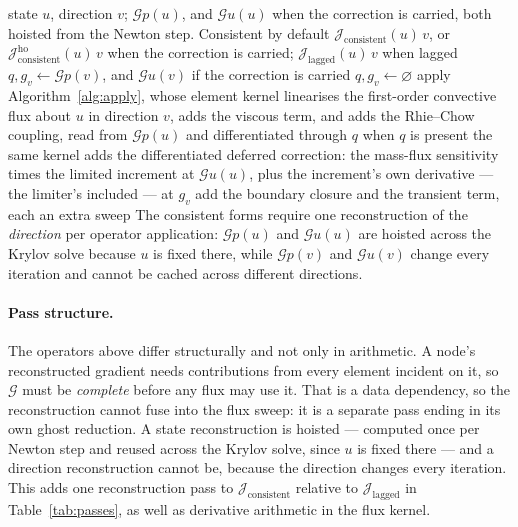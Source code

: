 \documentclass[sigconf,nonacm]{acmart}
\newcommand{\Gop}{\mathcal{G}}
\newcommand{\Jlag}{\mathcal{J}_{\mathrm{lagged}}}
\newcommand{\Jex}{\mathcal{J}_{\mathrm{consistent}}}
\newcommand{\Jhoex}{\mathcal{J}^{\mathrm{ho}}_{\mathrm{consistent}}}
\begin{document}
\begin{algorithm}
\caption{Jacobian action: $\Jex$, $\Jhoex$ and $\Jlag$}
\label{alg:jacaction}
\begin{algorithmic}[1]
\Require state $u$, direction $v$; $\Gop p(u)$, and $\Gop u(u)$ when the correction is carried,
         both hoisted from the Newton step. Consistent by default
\Ensure $\Jex(u)\,v$, or $\Jhoex(u)\,v$ when the correction is carried; $\Jlag(u)\,v$ when lagged
  \State $q, g_v \gets \Gop p(v)$, and $\Gop u(v)$ if the correction is carried
\Else
  \State $q, g_v \gets \varnothing$
\EndIf
\State apply Algorithm~\ref{alg:apply}, whose element kernel linearises the first-order
       convective flux about $u$ in direction $v$, adds the viscous term, and adds the
       Rhie--Chow coupling, read from $\Gop p(u)$ and differentiated through $q$ when $q$ is
       present
  \State the same kernel adds the differentiated deferred correction: the mass-flux sensitivity
         times the limited increment at $\Gop u(u)$, plus the increment's own derivative --- the
         limiter's included --- at $g_v$
\EndIf
\State add the boundary closure and the transient term, each an extra sweep
\Statex The consistent forms require one reconstruction of the \emph{direction} per operator application:
        $\Gop p(u)$ and $\Gop u(u)$ are hoisted across
        the Krylov solve because $u$ is fixed there, while $\Gop p(v)$ and $\Gop u(v)$ change
        every iteration and cannot be cached across different directions.
\end{algorithmic}
\end{algorithm}

\paragraph{Pass structure.} The operators above differ structurally and not only in arithmetic.
A node's reconstructed gradient needs contributions from every element incident on it, so $\Gop$
must be \emph{complete} before any flux may use it. That is a data dependency, so the
reconstruction cannot fuse into the flux sweep: it is a separate pass ending in its own ghost
reduction. A state reconstruction is hoisted --- computed once per Newton step and reused across
the Krylov solve, since $u$ is fixed there --- and a direction reconstruction cannot be, because
the direction changes every iteration. This adds one reconstruction pass to $\Jex$ relative to
$\Jlag$ in Table~\ref{tab:passes}, as well as derivative arithmetic in the flux kernel.
\end{document}
